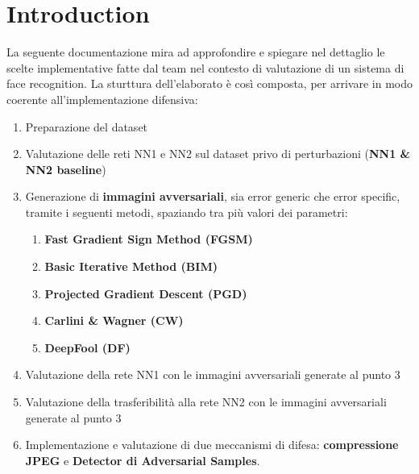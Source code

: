\documentclass[a4paper, 12pt]{article}
\begin{document}
\pagestyle{plain}
\tableofcontents
\newpage

\section{Introduction}
La seguente documentazione mira ad approfondire e spiegare nel dettaglio le scelte implementative fatte dal team nel contesto di valutazione di un sistema di face recognition. La sturttura dell'elaborato è così composta, per arrivare in modo coerente all'implementazione difensiva:

\begin{enumerate}
    \item Preparazione del dataset
    \item Valutazione delle reti NN1 e NN2 sul dataset privo di perturbazioni (\textbf{NN1 \& NN2 baseline})
    \item Generazione di \textbf{immagini avversariali}, sia error generic che error specific, tramite i seguenti metodi, spaziando tra più valori dei parametri:
    \begin{enumerate}
        \item \textbf{Fast Gradient Sign Method (FGSM)}
        \item \textbf{Basic Iterative Method (BIM)}
        \item \textbf{Projected Gradient Descent (PGD)}
        \item \textbf{Carlini \& Wagner (CW)}
        \item \textbf{DeepFool (DF)}
    \end{enumerate}
    \item Valutazione della rete NN1 con le immagini avversariali generate al punto 3
    \item Valutazione della trasferibilità alla rete NN2 con le immagini avversariali generate al punto 3
    \item Implementazione e valutazione di due meccanismi di difesa: \textbf{compressione JPEG} e \textbf{Detector di Adversarial Samples}.
\end{enumerate}

\clearpage
\end{document}

